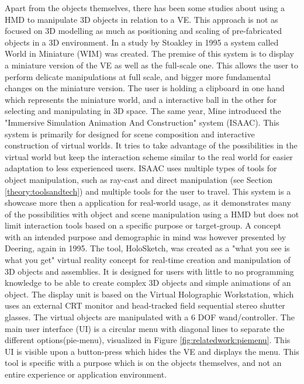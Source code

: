 Apart from the objects themselves, there has been some studies about using a HMD to manipulate 3D objects in relation to a VE. This approach is not as focused on 3D modelling as much as positioning and scaling of pre-fabricated objects in a 3D environment. In a study by Stoakley in 1995 a system called World in Miniature (WIM) was created\cite{relatedwork:stoakley1995virtual}. The premise of this system is to display a miniature version of the VE as well as the full-scale one. This allows the user to perform delicate manipulations at full scale, and bigger more fundamental changes on the miniature version. The user is holding a clipboard in one hand which represents the miniature world, and a interactive ball in the other for selecting and manipulating in 3D space. The same year, Mine introduced the "Immersive Simulation
Animation And Construction" system (ISAAC)\cite{relatedwork:mine1995isaac}. This system is primarily for designed for scene composition and interactive construction of virtual worlds. It tries to take advantage of the possibilities in the virtual world but keep the interaction scheme similar to the real world for easier adaptation to less experienced users. ISAAC uses multiple types of tools for object manipulation, such as ray-cast and direct manipulation (see Section \ref{theory:toolsandtech}) and multiple tools for the user to travel. This system is a showcase more then a application for real-world usage, as it demonstrates many of the possibilities with object and scene manipulation using a HMD but does not limit interaction tools based on a specific purpose or target-group. A concept with an intended purpose and demographic in mind was however presented by Deering, again in 1995\cite{relatedwork:deering1995holosketch}. The tool, HoloSketch, was created as a "what you see is what you get" virtual reality concept for real-time creation and manipulation of 3D objects and assemblies. It is designed for users with little to no programming knowledge to be able to create complex 3D objects and simple animations of an object. The display unit is based on the Virtual Holographic Workstation\cite{relatedwork:deering1992high}, which uses an external CRT monitor and head-tracked field sequential stereo shutter glasses. The virtual objects are manipulated with a 6 DOF wand/controller. The main user interface (UI) is a circular menu with diagonal lines to separate the different options(pie-menu), visualized in Figure \ref{fig:relatedwork:piemenu}. This UI is visible upon a button-press which hides the VE and displays the menu. This tool is specific with a purpose which is on the objects themselves, and not an entire experience or application environment.

